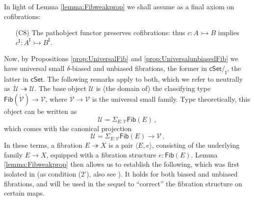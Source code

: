 \documentclass[12pt]{article}
\newcommand{\cSet}{\ensuremath{\mathsf{cSet}}}
\newcommand{\cof}{\ensuremath{\rightarrowtail}}
\newcommand{\fib}{\ensuremath{\twoheadrightarrow}}
\renewcommand{\to}{\ensuremath{\rightarrow}}
\newcommand{\too}{\ensuremath{\longrightarrow}}
\newcommand{\I}{\ensuremath{\mathrm{I}}}
\newcommand{\U}{\ensuremath{\mathcal{U}}}
\newcommand{\UU}{\ensuremath{\,\dot{\mathcal{U}}}}
\newcommand{\V}{\ensuremath{\mathcal{V}}}
\newcommand{\VV}{\ensuremath{\dot{\mathcal{V}}}}
\newcommand{\Fib}{\ensuremath{\mathsf{Fib}}}
\theoremstyle{remark}
\theoremstyle{definition}
\begin{document}
In light of Lemma \ref{lemma:Fibweakprop} we shall assume as a final axiom on cofibrations:
 
\begin{enumerate}
\item[(C8)] The pathobject functor preserves cofibrations: thus $c:A \cof B$ implies $c^\I:A^\I \cof B^\I$.
\end{enumerate}

Now, by Propositions \ref{prop:UniversalFib} and \ref{prop:UniversalunbiasedFib} we have universal small $\delta$-biased and unbiased fibrations, the former in $\cSet/_\I$, the latter in $\cSet$.  The following remarks apply to both, which we refer to neutrally as $\UU \fib \U$.  The base object $\U$ is (the domain of) the classifying type $\mathsf{Fib}(\VV) \to \V$, where $\VV \to \V$ is the universal small family.  Type theoretically, this object can be written as
\[
\U = \Sigma_{E:\V}\Fib(E)\,,
\] 
which comes with the canonical projection
\[
\U = \Sigma_{E:\V}\Fib(E) \too \V\,.
\] 
In these terms, a fibration $E \fib X$ is a pair $\langle E, e \rangle$, consisting of the underlying family $E\to X$, equipped with a fibration structure $e :\Fib(E)$.
%
\noindent Lemma \ref{lemma:Fibweakprop}  then allows us to establish the following, which was first isolated in \cite{Shu:UAERP}  (as condition (2'), also see \cite{Shu:15}). It holds for both biased and unbiased fibrations, and will be used in the sequel to ``correct'' the fibration structure on certain maps.
\end{document}
